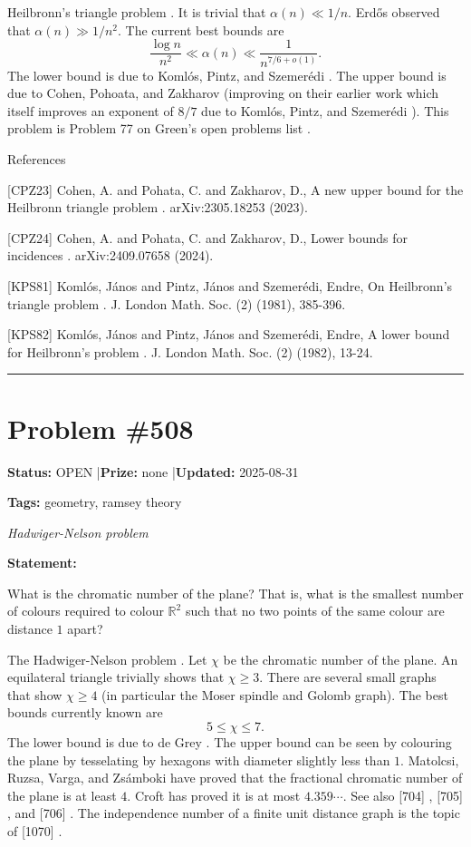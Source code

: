 \documentclass{article}
\begin{document}
Heilbronn's triangle problem . It is trivial that $\alpha(n) \ll 1/n$. Erd\H{o}s observed that $\alpha(n)\gg 1/n^2$. The current best bounds are\[\frac{\log n}{n^2}\ll \alpha(n) \ll \frac{1}{n^{7/6+o(1)}}.\]The lower bound is due to Koml\'{o}s, Pintz, and Szemer\'{e}di \cite{KPS82}. The upper bound is due to Cohen, Pohoata, and Zakharov \cite{CPZ24} (improving on their earlier work \cite{CPZ23} which itself improves an exponent of $8/7$ due to Koml\'{o}s, Pintz, and Szemer\'{e}di \cite{KPS81}). This problem is Problem 77 on Green's open problems list .




References

[CPZ23] Cohen, A. and Pohata, C. and Zakharov, D., A new upper bound for the Heilbronn triangle problem . arXiv:2305.18253 (2023).

[CPZ24] Cohen, A. and Pohata, C. and Zakharov, D., Lower bounds for incidences . arXiv:2409.07658 (2024).

[KPS81] Koml\'{o}s, J\'{a}nos and Pintz, J\'{a}nos and Szemer\'{e}di, Endre, On Heilbronn's triangle problem . J. London Math. Soc. (2) (1981), 385-396.

[KPS82] Koml\'{o}s, J\'{a}nos and Pintz, J\'{a}nos and Szemer\'{e}di, Endre, A lower bound for Heilbronn's problem . J. London Math. Soc. (2) (1982), 13-24.

\noindent\rule{\linewidth}{0.4pt}


\section{Problem \#508}
\label{prob:508}

\noindent\textbf{Status:} OPEN \quad|\quad \textbf{Prize:} none \quad|\quad \textbf{Updated:} 2025-08-31

\noindent\textbf{Tags:} geometry, ramsey theory

\medskip
\noindent\textit{Hadwiger-Nelson problem}


\noindent\textbf{Statement:}

What is the chromatic number of the plane? That is, what is the smallest number of colours required to colour $\mathbb{R}^2$ such that no two points of the same colour are distance $1$ apart?




The Hadwiger-Nelson problem . Let $\chi$ be the chromatic number of the plane. An equilateral triangle trivially shows that $\chi\geq 3$. There are several small graphs that show $\chi\geq 4$ (in particular the Moser spindle and Golomb graph). The best bounds currently known are\[5 \leq \chi \leq 7.\]The lower bound is due to de Grey \cite{dG18}. The upper bound can be seen by colouring the plane by tesselating by hexagons with diameter slightly less than $1$. Matolcsi, Ruzsa, Varga, and Zs\'{a}mboki have proved that the fractional chromatic number of the plane is at least $4$. Croft \cite{Cr67} has proved it is at most $4.359\cdots$. See also [704] , [705] , and [706] . The independence number of a finite unit distance graph is the topic of [1070] .
\end{document}
